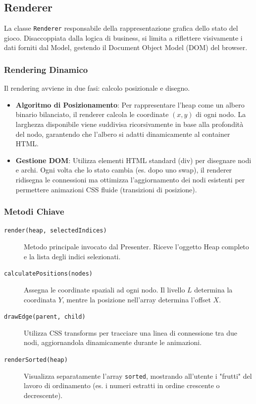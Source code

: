 \documentclass[openany]{theme/uniprthesis}
\begin{document}

\subsection{Renderer}
La classe \texttt{Renderer}  responsabile della rappresentazione grafica dello stato del gioco. Disaccoppiata dalla logica di business, si limita a riflettere visivamente i dati forniti dal Model, gestendo il Document Object Model (DOM) del browser.

\subsubsection*{Rendering Dinamico}
Il rendering avviene in due fasi: calcolo posizionale e disegno.
\begin{itemize}
    \item \textbf{Algoritmo di Posizionamento}: Per rappresentare l'heap come un albero binario bilanciato, il renderer calcola le coordinate $(x, y)$ di ogni nodo. La larghezza disponibile viene suddivisa ricorsivamente in base alla profondità del nodo, garantendo che l'albero si adatti dinamicamente al container HTML.
    \item \textbf{Gestione DOM}: Utilizza elementi HTML standard (div) per disegnare nodi e archi. Ogni volta che lo stato cambia (es. dopo uno swap), il renderer ridisegna le connessioni ma ottimizza l'aggiornamento dei nodi esistenti per permettere animazioni CSS fluide (transizioni di posizione).
\end{itemize}

\subsubsection*{Metodi Chiave}
\begin{description}
    \item[\texttt{render(heap, selectedIndices)}] Metodo principale invocato dal Presenter. Riceve l'oggetto Heap completo e la lista degli indici selezionati.
    \item[\texttt{calculatePositions(nodes)}] Assegna le coordinate spaziali ad ogni nodo. Il livello $L$ determina la coordinata $Y$, mentre la posizione nell'array determina l'offset $X$.
    \item[\texttt{drawEdge(parent, child)}] Utilizza CSS transforms per tracciare una linea di connessione tra due nodi, aggiornandola dinamicamente durante le animazioni.
    \item[\texttt{renderSorted(heap)}] Visualizza separatamente l'array \texttt{sorted}, mostrando all'utente i "frutti" del lavoro di ordinamento (es. i numeri estratti in ordine crescente o decrescente).
\end{description}
\end{document}

